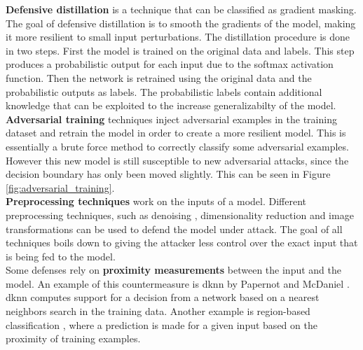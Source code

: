 \textbf{Defensive distillation}  \cite{defensive_distillation} is a technique that can be classified as gradient masking. The goal of defensive distillation is to smooth the gradients of the model, making it more resilient to small input perturbations. The distillation procedure is done in two steps. First the model is trained on the original data and labels. This step produces a probabilistic output for each input due to the softmax activation function. Then the network is retrained using the original data and the probabilistic outputs as labels. The probabilistic labels contain additional knowledge that can be exploited to the increase generalizabilty of the model.\\

\textbf{Adversarial training} \cite{FGSM} techniques inject adversarial examples in the training dataset and retrain the model in order to create a more resilient model. This is essentially a brute force method to correctly classify some adversarial examples. However this new model is still susceptible to new adversarial attacks, since the decision boundary has only been moved slightly. This can be seen in Figure \ref{fig:adversarial_training}.\\

\textbf{Preprocessing techniques} work on the inputs of a model. Different preprocessing techniques, such as denoising \cite{denoising}, dimensionality reduction \cite{dimensionality_reduction} and image transformations \cite{image_transformations} can be used to defend the model under attack. The goal of all techniques boils down to giving the attacker less control over the exact input that is being fed to the model.\\

Some defenses rely on \textbf{proximity measurements} between the input and the model. An example of this countermeasure is \gls{dknn} by Papernot and McDaniel \cite{dknn}. \gls{dknn} computes support for a decision from a network based on a nearest neighbors search in the training data. Another example is region-based classification \cite{region-based_classification}, where a prediction is made for a given input based on the proximity of training examples.\\ 

